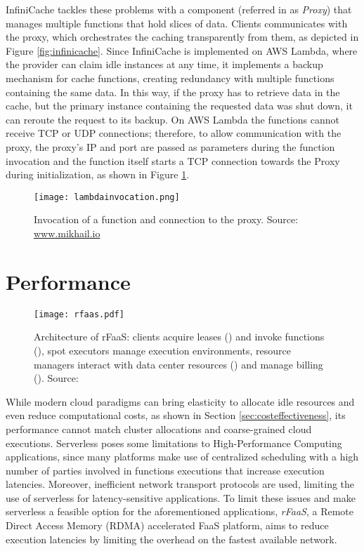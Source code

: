 \documentclass[
	a4paper, %
	12pt,
	twoside, %
]{LTJournalArticle}
\DeclareRobustCommand*\circledColorSmall[2]{\tikz[baseline=(char.base)]{
    \node[shape=circle,fill=#2,draw=#2,inner sep=0pt] (char) {\textcolor{white}{\footnotesize\textbf{#1}}};}}
\begin{document}
InfiniCache tackles these problems with a component (referred in \cite{wang_infinicache_nodate} as \textit{Proxy}) that manages multiple functions that hold slices of data. Clients communicates with the proxy, which orchestrates the caching transparently from them, as depicted in Figure \ref{fig:infinicache}.
Since InfiniCache is implemented on AWS Lambda, where the provider can claim idle instances at any time, it implements a backup mechanism for cache functions, creating redundancy with multiple functions containing the same data. In this way, if the proxy has to retrieve data in the cache, but the primary instance containing the requested data was shut down, it can reroute the request to its backup.
On AWS Lambda the functions cannot receive TCP or UDP connections; therefore, to allow communication with the proxy, the proxy's IP and port are passed as parameters during the function invocation and the function itself starts a TCP connection towards the Proxy during initialization, as shown in Figure \ref{fig:lambdainvocation}. 
\begin{figure}[!hbt]
	\texttt{[image: lambdainvocation.png]}
	\caption{Invocation of a function and connection to the proxy. Source: \href{https://mikhail.io/2020/03/infinicache-distributed-cache-on-aws-lambda/}{www.mikhail.io}}
	\label{fig:lambdainvocation}
\end{figure}
\section{Performance}
\label{sec:performance}

\begin{figure}[!hbt]
	\texttt{[image: rfaas.pdf]}
	\caption{Architecture of rFaaS: clients acquire leases (\circledColorSmall{A}{brown}) and invoke functions (\circledColorSmall{D}{brown}), spot executors manage execution environments, resource managers interact with data center resources (\circledColorSmall{C}{brown}) and manage billing (\circledColorSmall{B}{brown}). Source: \cite{copik_rfaas_2023}}
	\label{fig:rfaas}
\end{figure}

While modern cloud paradigms can bring elasticity to allocate idle resources and even reduce computational costs, as shown in Section \ref{sec:costeffectiveness}, its performance cannot match cluster allocations and coarse-grained cloud executions. Serverless poses some limitations to High-Performance Computing applications, since many platforms make use of centralized scheduling with a high number of parties involved in functions executions that increase execution latencies. Moreover, inefficient network transport protocols are used, limiting the use of serverless for latency-sensitive applications. To limit these issues and make serverless a feasible option for the aforementioned applications, \textit{rFaaS}, a Remote Direct Access Memory (RDMA) accelerated FaaS platform, aims to reduce execution latencies by limiting the overhead on the fastest available network.
\end{document}
